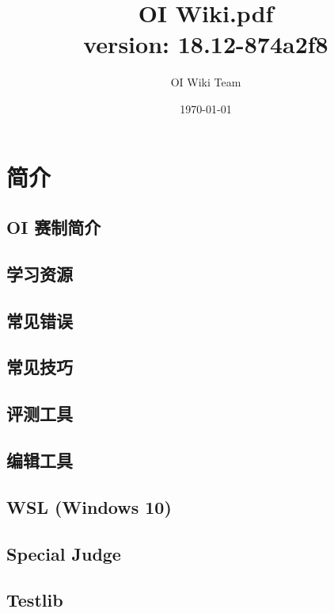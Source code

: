 
\title{OI Wiki.pdf \\ {\large version: 18.12-874a2f8} }
\author{OI Wiki Team}
\date{\today}


\frontmatter
\maketitle\thispagestyle{empty}
\cleardoublepage

\cleardoublepage
\setcounter{page}{1}
\tableofcontents
\cleardoublepage
\mainmatter
\setcounter{page}{1}
\chapter{简介}

\section{OI 赛制简介}

\section{学习资源}

\section{常见错误}

\section{常见技巧}

  \section{评测工具}
  
  \section{编辑工具}
  
  \section{WSL (Windows 10)}
  
  \section{Special Judge}
  
  \section{Testlib}
  

